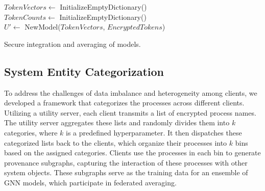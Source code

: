 \begin{algorithm}[!t]
  \scriptsize
  \DontPrintSemicolon
  \BlankLine
  $TokenVectors \leftarrow$ InitializeEmptyDictionary()\\
  $TokenCounts \leftarrow$ InitializeEmptyDictionary()\\
  $U' \leftarrow$ NewModel($TokenVectors$, $EncryptedTokens$) 
  \BlankLine
  \\
  \BlankLine
  \caption{Secure integration and averaging of \wordvec models.}
  \label{alg:secure_integration_averaging_word2vec}
\end{algorithm}

\subsection{System Entity Categorization}
\label{sys:catg}
To address the challenges of data imbalance and heterogeneity among clients, we developed a framework that categorizes the processes across different clients. Utilizing a utility server, each client transmits a list of encrypted process names. The utility server aggregates these lists and randomly divides them into \(k\) categories, where \(k\) is a predefined hyperparameter. It then dispatches these categorized lists back to the clients, which organize their processes into \(k\) bins based on the assigned categories. Clients use the processes in each bin to generate provenance subgraphs, capturing the interaction of these processes with other system objects. These subgraphs serve as the training data for an ensemble of GNN models, which participate in federated averaging.

